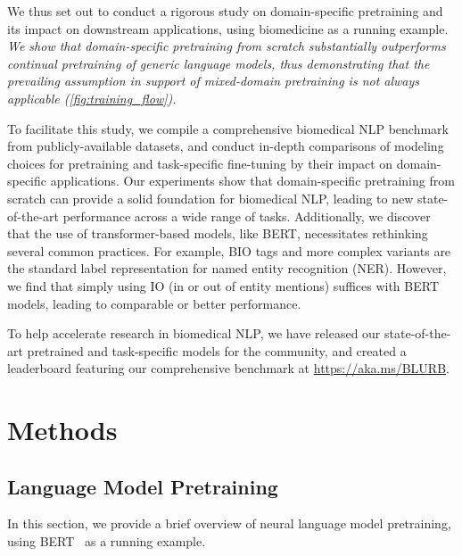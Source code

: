\documentclass[acmlarge,screen,nonacm]{acmart}
\begin{document}
We thus set out to conduct a rigorous study on domain-specific pretraining and its impact on downstream applications, using biomedicine as a running example.
{\em We show that domain-specific pretraining from scratch substantially outperforms continual pretraining of generic language models, thus demonstrating that the prevailing assumption in support of mixed-domain pretraining is not always applicable (\autoref{fig:training_flow}).}

To facilitate this study, we compile a comprehensive biomedical NLP benchmark from publicly-available datasets, and conduct in-depth comparisons of modeling choices for pretraining and task-specific fine-tuning by their impact on domain-specific applications.
Our experiments show that domain-specific pretraining from scratch can provide a solid foundation for biomedical NLP, leading to new state-of-the-art performance across a wide range of tasks.
Additionally, we discover that the use of transformer-based models, like BERT, necessitates rethinking several common practices. For example, BIO tags and more complex variants are the standard label representation for named entity recognition (NER). However, we find that simply using IO (in or out of entity mentions) suffices with BERT models, leading to comparable or better performance.


To help accelerate research in biomedical NLP, 
we have released our state-of-the-art pretrained and task-specific models for the community, and created a leaderboard featuring our comprehensive benchmark at \url{https://aka.ms/BLURB}.

 \section{Methods}




\subsection{Language Model Pretraining}

In this section, we provide a brief overview of neural language model pretraining, using BERT~\cite{devlin2018bert} as a running example.
\end{document}
